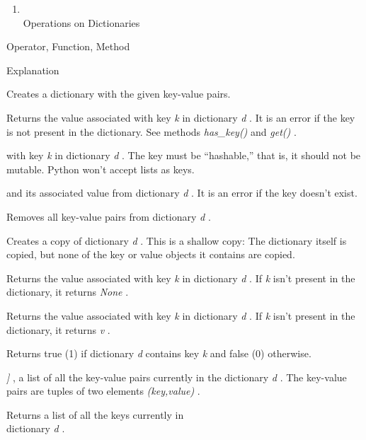 \begin{enumerate}
\tightlist
\item
  \\
  Operations on Dictionaries
\end{enumerate}

Operator, Function, Method

Explanation



Creates a dictionary with the given
key-value pairs.



Returns the value associated with
key \emph{k} in dictionary \emph{d} . It is an error if the key is not
present in the dictionary. See methods \emph{has\_key()} and
\emph{get()} .



 with key
\emph{k} in dictionary \emph{d} . The key must be ``hashable,'' that is,
it should not be mutable. Python won't accept lists as keys.



 and its
associated value from dictionary \emph{d} . It is an error if the key
doesn't exist.



Removes all key-value pairs from
dictionary \emph{d} .



Creates a copy of dictionary
\emph{d} . This is a shallow copy: The dictionary itself is copied, but
none of the key or value objects it contains are copied.



Returns the value associated with
key \emph{k} in dictionary \emph{d} . If \emph{k} isn't present in the
dictionary, it returns \emph{None} .



Returns the value associated with
key \emph{k} in dictionary \emph{d} . If \emph{k} isn't present in the
dictionary, it returns \emph{v} .



Returns true (1) if dictionary
\emph{d} contains key \emph{k} and false (0) otherwise.




\emph{{]}} , a list of all the key-value pairs currently in the
dictionary \emph{d} . The key-value pairs are tuples of two elements
\emph{(key,value)} .



Returns a list of all the keys
currently in\\
dictionary \emph{d} .




